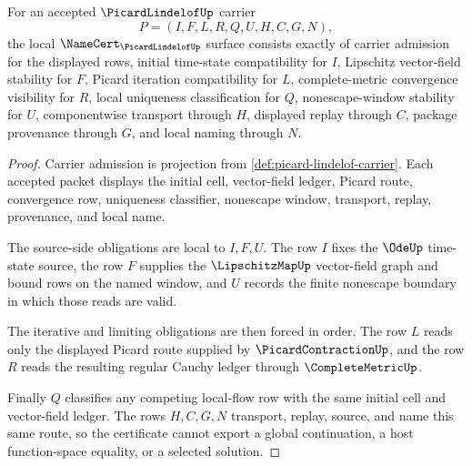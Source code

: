 \begin{theorem}
\label{thm:picard-lindelof-namecert-obligations}
For an accepted $\PicardLindelofUp$ carrier
$$
P=(I,F,L,R,Q,U,H,C,G,N),
$$
the local $\NameCert_{\PicardLindelofUp}$ surface consists exactly of carrier admission for the displayed rows, initial time-state compatibility for $I$, Lipschitz vector-field stability for $F$, Picard iteration compatibility for $L$, complete-metric convergence visibility for $R$, local uniqueness classification for $Q$, nonescape-window stability for $U$, componentwise transport through $H$, displayed replay through $C$, package provenance through $G$, and local naming through $N$.
\end{theorem}
\begin{proof}
Carrier admission is projection from \autoref{def:picard-lindelof-carrier}. Each accepted packet displays the initial cell, vector-field ledger, Picard route, convergence row, uniqueness classifier, nonescape window, transport, replay, provenance, and local name.

The source-side obligations are local to $I,F,U$. The row $I$ fixes the $\OdeUp$ time-state source, the row $F$ supplies the $\LipschitzMapUp$ vector-field graph and bound rows on the named window, and $U$ records the finite nonescape boundary in which those reads are valid.

The iterative and limiting obligations are then forced in order. The row $L$ reads only the displayed Picard route supplied by $\PicardContractionUp$, and the row $R$ reads the resulting regular Cauchy ledger through $\CompleteMetricUp$.

Finally $Q$ classifies any competing local-flow row with the same initial cell and vector-field ledger. The rows $H,C,G,N$ transport, replay, source, and name this same route, so the certificate cannot export a global continuation, a host function-space equality, or a selected solution.
\end{proof}

